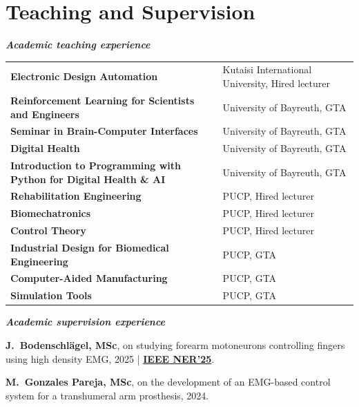 \documentclass[a4paper,10pt]{article}
\begin{document}
\section{Teaching and Supervision}

\textbf{\textit{Academic teaching experience}}

\vspace{2pt}
\begin{tabular}{@{}ll}
  \textbf{Electronic Design Automation} & Kutaisi International University, Hired lecturer\\
  \textbf{Reinforcement Learning for Scientists and Engineers} & University of Bayreuth, GTA\\
  \textbf{Seminar in Brain-Computer Interfaces}                 & University of Bayreuth, GTA\\
  \textbf{Digital Health}                                       & University of Bayreuth, GTA\\
  \textbf{Introduction to Programming with Python for Digital Health \& AI}
                                                                & University of Bayreuth, GTA\\
  \textbf{Rehabilitation Engineering}
    & PUCP, Hired lecturer\\
  \textbf{Biomechatronics}
    & PUCP, Hired lecturer\\
  \textbf{Control Theory}
    & PUCP, Hired lecturer\\
  \textbf{Industrial Design for Biomedical Engineering}         & PUCP, GTA\\
  \textbf{Computer-Aided Manufacturing}                         & PUCP, GTA\\
  \textbf{Simulation Tools}                                     & PUCP, GTA\\
\end{tabular}

\vspace{4pt}
\textbf{\textit{Academic supervision experience}}

\vspace{2pt}
\textbf{J.\ Bodenschl\"agel, MSc}, on studying forearm motoneurons controlling fingers using
high density EMG, 2025 |
\href{https://cmsfiles.s3.amazonaws.com/ner2025/proceedings/61569_CFP25CNE-ART/pdfs/0000634.pdf}{\textbf{IEEE NER'25}}.

\textbf{M.\ Gonzales Pareja, MSc}, on the development of an EMG-based control system for a
transhumeral arm prosthesis, 2024.
\end{document}
